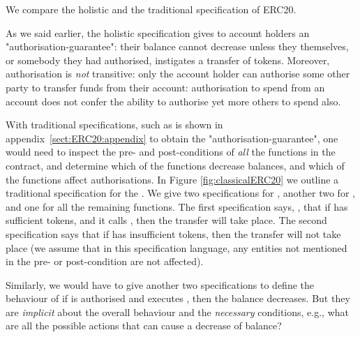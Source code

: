 We compare the holistic and the traditional specification of ERC20.

As we said earlier,  the holistic specification gives to account holders an
 "authorisation-guarantee": their balance cannot decrease unless they
 themselves, or somebody they had authorised, instigates a transfer of
 tokens. Moreover, authorisation is {\em not} transitive: only the
 account holder can authorise some other party to transfer funds from
 their account: authorisation to spend from an account does not confer
 the ability to authorise yet more others to spend also.
 
 With traditional  specifications, such as is shown in appendix~\ref{sect:ERC20:appendix} to obtain the "authorisation-guarantee", 
one would need to inspect the pre- and post-conditions of {\em all} the functions
in the contract, and determine which of the functions decrease balances, and which of the functions 
 affect authorisations.
In Figure \ref{fig:classicalERC20} we outline a traditional specification for the .
We give two specifications for , another two for , and one for all 
the remaining functions. The  first specification says, \eg, that if  
  has sufficient tokens, and it calls , then the transfer will take place.  
The second specification says that  if  has insufficient tokens, then 
the transfer will not take place (we assume that in this
specification language, any entities not mentioned in the pre- or post-condition 
are not affected).
 
 Similarly, we would have to give another two specifications to define the behaviour of 
if  is authorised and executes , then   the balance decreases. 
But they are {\em implicit} about the overall behaviour and the   {\em necessary} conditions,
e.g., what are all the possible actions that can cause a decrease of balance?

